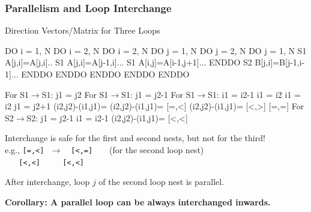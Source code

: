 \documentclass{beamer}
\renewcommand{\emph}[1]{\textcolor{structure}{#1}}
\newcommand{\emp}[1]{\textcolor{DikuRed}{ #1}}
\newcommand{\mymath}[1]{$ #1 $}
\begin{document}
\begin{frame}[fragile,t]
  \frametitle{Parallelism and Loop Interchange} %

\begin{block}{Direction Vectors/Matrix for Three Loops }
\begin{colorcode}
  DO i = 1, N            DO i = 2, N               DO i = 2, N
    DO j = 1, N            DO j = 2, N               DO j = 1, N 
S1    A[j,i]=A[j,i]..  S1   A[j,i]=A[j-1,i]...   S1    A[i,j]=A[i-1,j+1]...
    ENDDO              S2   B[j,i]=B[j-1,i-1]...     ENDDO
  ENDDO                  ENDDO ENDDO               ENDDO

For S1\mymath{\rightarrow}S1: j1 = j2    For S1\mymath{\rightarrow}S1: j1 = j2-1          For S1\mymath{\rightarrow}S1: i1 = i2-1
            i1 = i2                i1 = i2                    j1 = j2+1
(i2,j2)-(i1,j1)=         (i2,j2)-(i1,j1)=\emp{[=,<]}        (i2,j2)-(i1,j1)=\emp{[<,>]}
\emp{[=,=]}                  For S2\mymath{\rightarrow}S2: j1 = j2-1
                                   i1 = i2-1
                         (i2,j2)-(i1,j1)=\emp{[<,<]}
\end{colorcode}
\end{block} 

Interchange is safe for the first and second nests, but not for the third!\\
e.g., \emp{\tt [=,<]}$~~~\rightarrow~~~$ \emph{\tt [<,=]}$~~~~~~~~~$(for the second loop nest)\\
$~~~~~~$\emp{\tt [<,<]}$~~~~~~~~~~~~$\emph{\tt [<,<]}

\pause\smallskip

After interchange, loop $j$ of the second loop nest is parallel.

\bigskip

\emph{\bf Corollary: A parallel loop can be always interchanged inwards.}
\end{frame}
\end{document}

